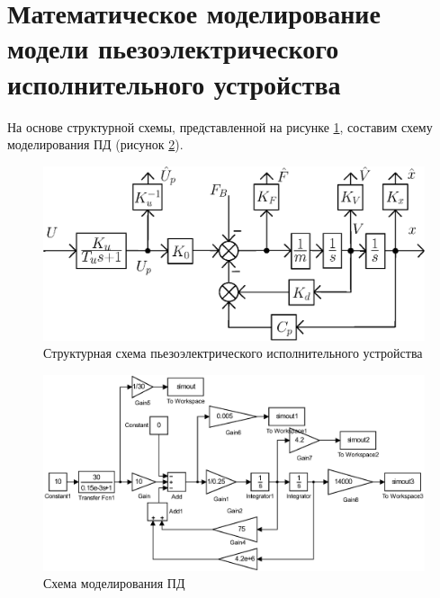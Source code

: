 \documentclass[a4paper,12pt]{article} %
\begin{document}
\section{Математическое моделирование модели пьезоэлектрического исполнительного устройства}	 
На основе структурной схемы, представленной на рисунке \ref{structScheme}, составим схему моделирования ПД (рисунок \ref{cxema1}).
\begin{figure}[ht!]
	\centering
	\includegraphics[width = 0.8 \textwidth]{scheme/structScheme}
	\caption{Структурная схема пьезоэлектрического исполнительного устройства}
	\label{structScheme}
\end{figure}
\begin{figure}[ht!]
	\centering
	\includegraphics[width = \textwidth]{scheme/scheme1}
	\caption{Схема моделирования ПД}
	\label{cxema1}
\end{figure}
\end{document}
